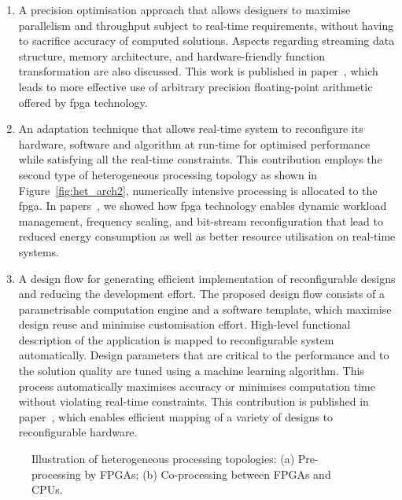\begin{enumerate}
\item A precision optimisation approach that allows designers to maximise parallelism and throughput subject to real-time requirements, without having to sacrifice accuracy of computed solutions.
Aspects regarding streaming data structure, memory architecture, and hardware-friendly function transformation are also discussed.
This work is published in paper~\cite{chau13fpt}, which leads to more effective use of arbitrary precision floating-point arithmetic offered by \gls{fpga} technology.
\item An adaptation technique that allows real-time system to reconfigure its hardware, software and algorithm at run-time for optimised performance while satisfying all the real-time constraints.
This contribution employs the second type of heterogeneous processing topology as shown in Figure~\ref{fig:het_arch2}, numerically intensive processing is allocated to the \gls{fpga}.
In papers~\cite{chau13arc,chau14trets}, we showed how \gls{fpga} technology enables dynamic workload management, frequency scaling, and bit-stream reconfiguration that lead to reduced energy consumption as well as better resource utilisation on real-time systems. 
\item A design flow for generating efficient implementation of reconfigurable designs and reducing the development effort.
The proposed design flow consists of a parametrisable computation engine and a software template, which maximise design reuse and minimise customisation effort.
High-level functional description of the application is mapped to reconfigurable system automatically.
Design parameters that are critical to the performance and to the solution quality are tuned using a machine learning algorithm.
This process automatically maximises accuracy or minimises computation time without violating real-time constraints.
This contribution is published in paper~\cite{chau14fccm}, which enables efficient mapping of a variety of designs to reconfigurable hardware.
\end{enumerate}

\setcounter{subfigure}{0}
\begin{figure}[t!]
\centering
{}
\caption{Illustration of heterogeneous processing topologies: (a) Pre-processing by FPGAs; (b) Co-processing between FPGAs and CPUs.}
\label{fig:het_arch}
\end{figure}


